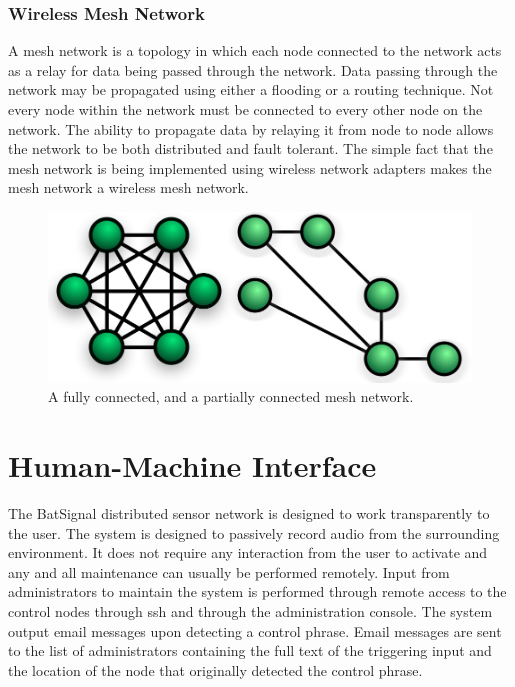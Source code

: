 \documentclass[11pt,a4paper]{article}
\begin{document}
\subsubsection{Wireless Mesh Network}
A mesh network is a topology in which each node connected to the network acts as a relay for data being passed through the network. Data passing through the network may be propagated using either a flooding or a routing technique. Not every node within the network must be connected to every other node on the network. The ability to propagate data by relaying it from node to node allows the network to be both distributed and fault tolerant. The simple fact that the mesh network is being implemented using wireless network adapters makes the mesh network a wireless mesh network. 
\begin{figure}[h!]
	\centering
		\includegraphics[width=\textwidth, keepaspectratio=true]{Graphics/mesh-networks.jpg}
	\caption{A fully connected, and a partially connected mesh network.}
\end{figure}


\section{Human-Machine Interface}
The BatSignal distributed sensor network is designed to work transparently to the user. The system is designed to passively record audio from the surrounding environment.  It does not require any interaction from the user to activate and any and all maintenance can usually be performed remotely.  Input from administrators to maintain the system is performed through remote access to the control nodes through ssh and through the administration console.  The system output email messages upon detecting a control phrase.  Email messages are sent to the list of administrators containing the full text of the triggering input and the location of the node that originally detected the control phrase.
\end{document}
